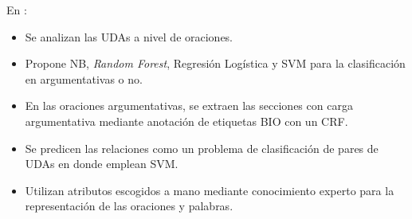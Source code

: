 \documentclass[a4paper,11pt,twocolumn,twoside]{article}
\begin{document}

En \cite{goudas2015argument}:

\begin{itemize}
	\item Se analizan las UDAs a nivel de oraciones.
	\item Propone NB, \textit{Random Forest}, Regresión Logística y SVM 
	para la clasificación en argumentativas o no.
	\item En las oraciones argumentativas, se extraen las secciones con carga argumentativa 
	mediante anotación de etiquetas BIO con un CRF.
	\item Se predicen las relaciones como un problema de clasificación de pares de UDAs en donde emplean
	SVM. 
	\item Utilizan atributos escogidos a mano mediante conocimiento experto para la representación de 
	las oraciones y palabras.
\end{itemize}

\end{document}
